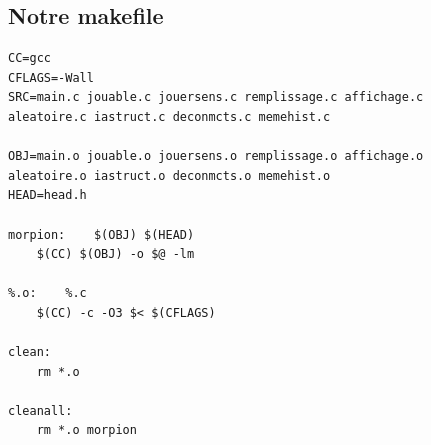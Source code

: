\documentclass[11pt]{article}
\begin{document}
\subsection{Notre makefile}
\begin{verbatim}
CC=gcc
CFLAGS=-Wall
SRC=main.c jouable.c jouersens.c remplissage.c affichage.c
aleatoire.c iastruct.c deconmcts.c memehist.c

OBJ=main.o jouable.o jouersens.o remplissage.o affichage.o
aleatoire.o iastruct.o deconmcts.o memehist.o
HEAD=head.h 

morpion:    $(OBJ) $(HEAD)
	$(CC) $(OBJ) -o $@ -lm

%.o:	%.c
	$(CC) -c -O3 $< $(CFLAGS)

clean:
	rm *.o

cleanall:
	rm *.o morpion
\end{verbatim}
\end{document}
